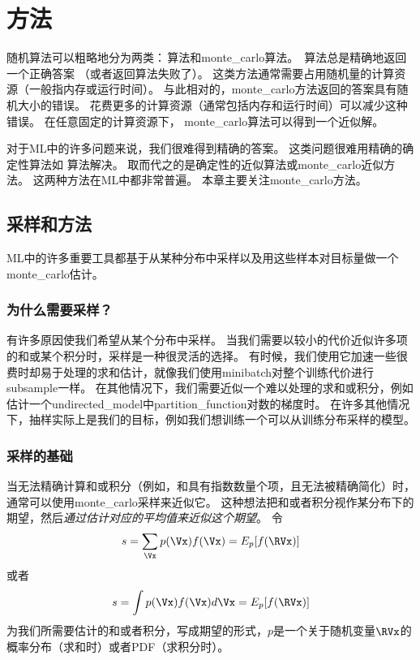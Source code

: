 \chapter{方法}
\label{chap:monte_carlo_methods}

随机算法可以粗略地分为两类：\,算法和\gls{monte_carlo}算法。
\,算法总是精确地返回一个正确答案 （或者返回算法失败了）。   
这类方法通常需要占用随机量的计算资源（一般指内存或运行时间）。    
与此相对的，\gls{monte_carlo}方法返回的答案具有随机大小的错误。 
花费更多的计算资源（通常包括内存和运行时间）可以减少这种错误。
在任意固定的计算资源下， \gls{monte_carlo}算法可以得到一个近似解。

对于\gls{ML}中的许多问题来说，我们很难得到精确的答案。
这类问题很难用精确的确定性算法如\,\,算法解决。
取而代之的是确定性的近似算法或\gls{monte_carlo}近似方法。
这两种方法在\gls{ML}中都非常普遍。
本章主要关注\gls{monte_carlo}方法。

\section{采样和方法}
\label{sec:sampling_and_monte_carlo_methods}

\gls{ML}中的许多重要工具都基于从某种分布中采样以及用这些样本对目标量做一个\gls{monte_carlo}估计。

\subsection{为什么需要采样？}
\label{sec:why_sampling}

有许多原因使我们希望从某个分布中采样。  
当我们需要以较小的代价近似许多项的和或某个积分时，采样是一种很灵活的选择。  
有时候，我们使用它加速一些很费时却易于处理的求和估计，就像我们使用\gls{minibatch}对整个训练代价进行\gls{subsample}一样。 
在其他情况下，我们需要近似一个难以处理的求和或积分，例如估计一个\gls{undirected_model}中\gls{partition_function}对数的梯度时。 
在许多其他情况下，抽样实际上是我们的目标，例如我们想训练一个可以从训练分布采样的模型。  

\subsection{采样的基础}
\label{sec:basics_of_monte_carlo_sampling}

当无法精确计算和或积分（例如，和具有指数数量个项，且无法被精确简化）时，通常可以使用\gls{monte_carlo}采样来近似它。
这种想法把和或者积分视作某分布下的期望，然后\emph{通过估计对应的平均值来近似这个期望}。
令
\begin{align}
s = \sum_{\Vx} p(\Vx)f(\Vx) = E_p[f(\RVx)]
\end{align}
或者
\begin{align}
\label{eqn:integra}
s = \int p(\Vx)f(\Vx)d\Vx = E_p[f(\RVx)]
\end{align}
为我们所需要估计的和或者积分，写成期望的形式，$p$是一个关于随机变量$\RVx$的概率分布（求和时）或者\gls{PDF}（求积分时）。

